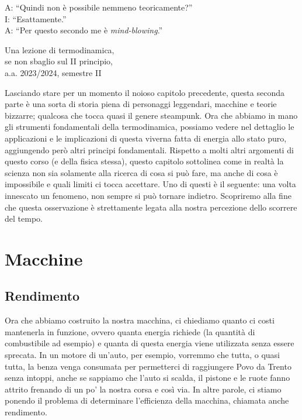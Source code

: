 \marginpar{\minitoc}

\epigraph{A: ``Quindi non è possibile nemmeno teoricamente?''\\I: ``Esattamente.''\\A: ``Per questo secondo me è \emph{mind-blowing}.''}{Una lezione di termodinamica,\\se non sbaglio sul II principio,\\a.a. 2023/2024, semestre II}

Lasciando stare per un momento il noioso capitolo precedente,
questa seconda parte è una sorta di storia piena di personaggi
leggendari, macchine e teorie bizzarre; qualcosa che tocca
quasi il genere steampunk. Ora che abbiamo in mano gli strumenti
fondamentali della termodinamica, possiamo vedere nel
dettaglio le applicazioni e le implicazioni di questa viverna
fatta di energia allo stato puro, aggiungendo però altri
principi fondamentali. Rispetto a molti altri
argomenti di questo corso (e della fisica stessa), questo
capitolo sottolinea come in realtà la scienza non sia
solamente alla ricerca di cosa si può fare, ma anche di
cosa è impossibile e quali limiti ci tocca accettare. Uno
di questi è il seguente: una
volta innescato un fenomeno, non sempre si può tornare indietro.
Scopriremo alla fine che questa osservazione è strettamente
legata alla nostra percezione dello scorrere del tempo.

\section{Macchine}


\subsection{Rendimento}
Ora che abbiamo costruito la nostra macchina, ci chiediamo quanto ci
costi mantenerla in funzione, ovvero quanta energia richiede (la quantità
di combustibile ad esempio) e quanta di questa energia viene utilizzata
senza essere sprecata. In un motore di un'auto, per esempio, vorremmo che
tutta, o quasi tutta, la benza venga consumata per permetterci di raggiungere
Povo da Trento senza intoppi, anche se sappiamo che l'auto si scalda, il pistone
e le ruote fanno attrito frenando di un po' la nostra corsa e così via.
In altre parole, ci stiamo ponendo il problema
di determinare l'efficienza della macchina, chiamata anche rendimento.


